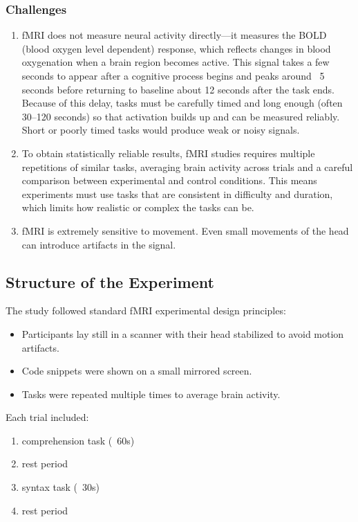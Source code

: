 \subsubsection{Challenges}
\begin{enumerate}
    \item fMRI does not measure neural activity directly—it measures the BOLD (blood oxygen level dependent) response, which reflects changes in blood oxygenation when a brain region becomes active. This signal takes a few seconds to appear after a cognitive process begins and peaks around ~5 seconds before returning to baseline about 12 seconds after the task ends. Because of this delay, tasks must be carefully timed and long enough (often 30–120 seconds) so that activation builds up and can be measured reliably. Short or poorly timed tasks would produce weak or noisy signals.
    \item To obtain statistically reliable results, fMRI studies requires multiple repetitions of similar tasks, averaging brain activity across trials and a careful comparison between experimental and control conditions. This means experiments must use tasks that are consistent in difficulty and duration, which limits how realistic or complex the tasks can be.
    \item fMRI is extremely sensitive to movement. Even small movements of the head can introduce artifacts in the signal.
\end{enumerate}

\subsection{Structure of the Experiment}

The study followed standard fMRI experimental design principles:

\begin{itemize}
    \item Participants lay still in a scanner with their head stabilized to avoid motion artifacts.
    \item Code snippets were shown on a small mirrored screen.
    \item Tasks were repeated multiple times to average brain activity.
\end{itemize}

Each trial included:
\begin{enumerate}
    \item comprehension task (~60s)
    \item rest period
    \item syntax task (~30s)
    \item rest period
\end{enumerate}

